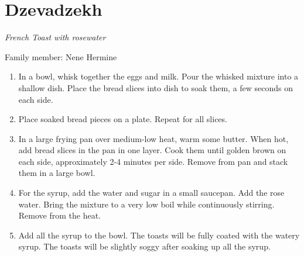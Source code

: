 \chapter{Dzevadzekh}
\label{ch:frenchtoast}


\textit{French Toast with rosewater}

Family member: Nene Hermine

\begin{enumerate}
    \item In a bowl, whisk together the eggs and milk. Pour the whisked mixture into a shallow dish. Place the bread slices into dish to soak them, a few seconds on each side.
    \item Place soaked bread pieces on a plate. Repeat for all slices.
    \item In a large frying pan over medium-low heat, warm some butter. When hot, add bread slices in the pan in one layer. Cook them until golden brown on each side, approximately 2-4 minutes per side. Remove from pan and stack them in a large bowl.
    \item For the syrup, add the water and sugar in a small saucepan. Add the rose water. Bring the mixture to a very low boil while continuously stirring. Remove from the heat.
    \item Add all the syrup to the bowl. The toasts will be fully coated with the watery syrup. The toasts will be slightly soggy after soaking up all the syrup.
\end{enumerate}

